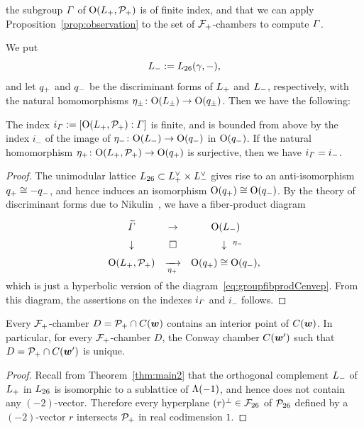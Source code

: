 \documentclass{amsart} %
\begin{document}
the subgroup $\varGamma$ of $ \mathord{\mathrm{O}}(L_{+}, \mathord{\mathcal{P}}_{+})$ is of finite index,
and that we can apply
Proposition~\ref{prop:observation}
to the set of $\mathord{\mathcal{F}}_{+}$-chambers
to compute $\varGamma$.
%
\par
We put 
\[
L_{-}:=L_{26}(\gamma, -),
\]
and let $q_{+}$ and $q_{-}$ be the discriminant forms 
of $L_{+}$ and $L_{-}$, respectively,
with the natural homomorphisms $\eta_{\pm}\colon \mathord{\mathrm{O}}(L_{\pm})\to \mathord{\mathrm{O}}(q_{\pm})$.
Then we have the following:
%
\begin{proposition}\label{prop:vGamindex}
The index $i_{\varGamma}:=[\mathord{\mathrm{O}}(L_{+}, \mathord{\mathcal{P}}_{+}): \varGamma]$ 
is finite, and is bounded from above by the index $i_{-}$ of the image 
of ${\eta}_{-}\colon \mathord{\mathrm{O}}(L_{-}) \to \mathord{\mathrm{O}}(q_{-})$ 
in $\mathord{\mathrm{O}}(q_{-})$.
If the natural homomorphism ${\eta}_{+}\colon \mathord{\mathrm{O}}(L_{+}, \mathord{\mathcal{P}}_{+}) \to \mathord{\mathrm{O}}(q_{+})$ is surjective, 
then we have  $i_{\varGamma}=i_{-}$.
\end{proposition}
%
\begin{proof}
The unimodular lattice $L_{26}\subset L_{+}^{\vee}\times L_{-}^{\vee}$ 
gives rise to an anti-isomorphism $q_{+}\cong -q_{-}$, 
and hence induces an isomorphism
$\mathord{\mathrm{O}}(q_{+})\cong \mathord{\mathrm{O}}(q_{-})$.
By the theory of discriminant forms due to Nikulin~\cite{MR525944}, 
we have a fiber-product diagram
%
\begin{equation}\label{eq:groupfibprodP}
\renewcommand{\arraystretch}{1.5}
\begin{array}{ccc}
\tilvGam &\to & \OG(\Lminus) \\
\downarrow & \square& \downarrow\rlap{ ${}^{\etaminus}$} \\
\OG(\Lplus, \PPPplus) & \maprightsb{\etaplus} & \OG(\qplus)\cong \OG(\qminus), 
\end{array}
\end{equation}
% 
which is just 
a hyperbolic version of the diagram~\eqref{eq:groupfibprodCenvep}.
From this diagram, the assertions on the indexes $i_{\varGamma}$ and $i_{-}$ follows.
\end{proof}
%
%
\begin{proposition}\label{prop:interior}
Every $\mathord{\mathcal{F}}_{+}$-chamber $D=\mathord{\mathcal{P}}_{+} \cap \mathord{C}(\boldsymbol{w})$
contains an interior point of $ \mathord{C}(\boldsymbol{w})$.
In particular, for every $\mathord{\mathcal{F}}_{+}$-chamber $D$,
the Conway chamber $ \mathord{C}(\boldsymbol{w}^{\prime}) $
such that $D=\mathord{\mathcal{P}}_{+} \cap \mathord{C}(\boldsymbol{w}^{\prime})$ is unique.
\end{proposition}
%
\begin{proof}
Recall from Theorem~\ref{thm:main2} that 
the orthogonal complement $L_{-}$
 of $L_{+}$ in $L_{26}$
is isomorphic to a sublattice of $\Lambda(-1)$,
and hence does not contain any $(-2)$-vector.
Therefore every hyperplane $(r)^{\perp}\in {\mathord{\mathcal{F}}}_{26}$ of $\mathord{\mathcal{P}}_{26}$ defined by a $(-2)$-vector $r$ 
intersects $\mathord{\mathcal{P}}_{+}$ in real codimension $1$.
\end{proof}
\end{document}
